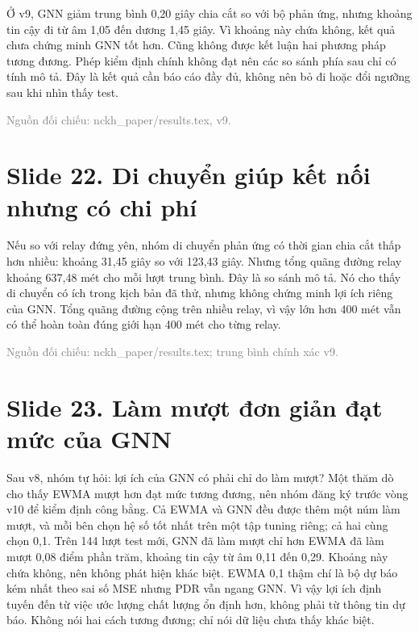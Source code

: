 
Ở v9, GNN giảm trung bình 0,20 giây chia cắt so với bộ phản ứng, nhưng khoảng tin cậy đi từ âm 1,05 đến dương 1,45 giây. Vì khoảng này chứa không, kết quả chưa chứng minh GNN tốt hơn. Cũng không được kết luận hai phương pháp tương đương. Phép kiểm định chính không đạt nên các so sánh phía sau chỉ có tính mô tả. Đây là kết quả cần báo cáo đầy đủ, không nên bỏ đi hoặc đổi ngưỡng sau khi nhìn thấy test.

{\small\textcolor{gray}{Nguồn đối chiếu: nckh\_paper/results.tex, v9.}}




\section*{Slide 22. Di chuyển giúp kết nối nhưng có chi phí}


Nếu so với relay đứng yên, nhóm di chuyển phản ứng có thời gian chia cắt thấp hơn nhiều: khoảng 31,45 giây so với 123,43 giây. Nhưng tổng quãng đường relay khoảng 637,48 mét cho mỗi lượt trung bình. Đây là so sánh mô tả. Nó cho thấy di chuyển có ích trong kịch bản đã thử, nhưng không chứng minh lợi ích riêng của GNN. Tổng quãng đường cộng trên nhiều relay, vì vậy lớn hơn 400 mét vẫn có thể hoàn toàn đúng giới hạn 400 mét cho từng relay.

{\small\textcolor{gray}{Nguồn đối chiếu: nckh\_paper/results.tex; trung bình chính xác v9.}}




\section*{Slide 23. Làm mượt đơn giản đạt mức của GNN}


Sau v8, nhóm tự hỏi: lợi ích của GNN có phải chỉ do làm mượt? Một thăm dò cho thấy EWMA mượt hơn đạt mức tương đương, nên nhóm đăng ký trước vòng v10 để kiểm định công bằng. Cả EWMA và GNN đều được thêm một núm làm mượt, và mỗi bên chọn hệ số tốt nhất trên một tập tuning riêng; cả hai cùng chọn 0,1. Trên 144 lượt test mới, GNN đã làm mượt chỉ hơn EWMA đã làm mượt 0,08 điểm phần trăm, khoảng tin cậy từ âm 0,11 đến 0,29. Khoảng này chứa không, nên không phát hiện khác biệt. EWMA 0,1 thậm chí là bộ dự báo kém nhất theo sai số MSE nhưng PDR vẫn ngang GNN. Vì vậy lợi ích định tuyến đến từ việc ước lượng chất lượng ổn định hơn, không phải từ thông tin dự báo. Không nói hai cách tương đương; chỉ nói dữ liệu chưa thấy khác biệt.

